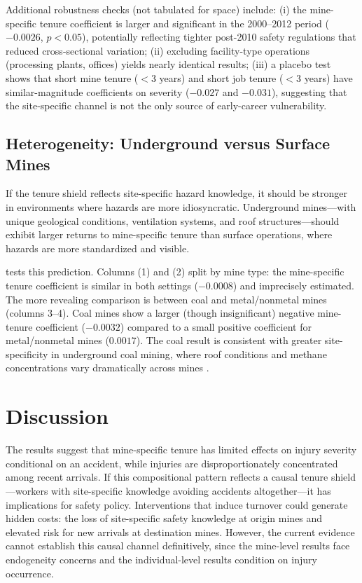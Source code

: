 \documentclass[12pt]{article}
\begin{document}
Additional robustness checks (not tabulated for space) include: (i) the mine-specific tenure coefficient is larger and significant in the 2000--2012 period ($-0.0026$, $p < 0.05$), potentially reflecting tighter post-2010 safety regulations that reduced cross-sectional variation; (ii) excluding facility-type operations (processing plants, offices) yields nearly identical results; (iii) a placebo test shows that short mine tenure ($<$3 years) and short job tenure ($<$3 years) have similar-magnitude coefficients on severity ($-0.027$ and $-0.031$), suggesting that the site-specific channel is not the only source of early-career vulnerability.

\subsection{Heterogeneity: Underground versus Surface Mines}



If the tenure shield reflects site-specific hazard knowledge, it should be stronger in environments where hazards are more idiosyncratic. Underground mines---with unique geological conditions, ventilation systems, and roof structures---should exhibit larger returns to mine-specific tenure than surface operations, where hazards are more standardized and visible.

 tests this prediction. Columns (1) and (2) split by mine type: the mine-specific tenure coefficient is similar in both settings ($-0.0008$) and imprecisely estimated. The more revealing comparison is between coal and metal/nonmetal mines (columns 3--4). Coal mines show a larger (though insignificant) negative mine-tenure coefficient ($-0.0032$) compared to a small positive coefficient for metal/nonmetal mines ($0.0017$). The coal result is consistent with greater site-specificity in underground coal mining, where roof conditions and methane concentrations vary dramatically across mines \citep{NIOSH2018}.


\section{Discussion}\label{sec:discussion}

The results suggest that mine-specific tenure has limited effects on injury severity conditional on an accident, while injuries are disproportionately concentrated among recent arrivals. If this compositional pattern reflects a causal tenure shield---workers with site-specific knowledge avoiding accidents altogether---it has implications for safety policy. Interventions that induce turnover could generate hidden costs: the loss of site-specific safety knowledge at origin mines and elevated risk for new arrivals at destination mines. However, the current evidence cannot establish this causal channel definitively, since the mine-level results face endogeneity concerns and the individual-level results condition on injury occurrence.
\end{document}
